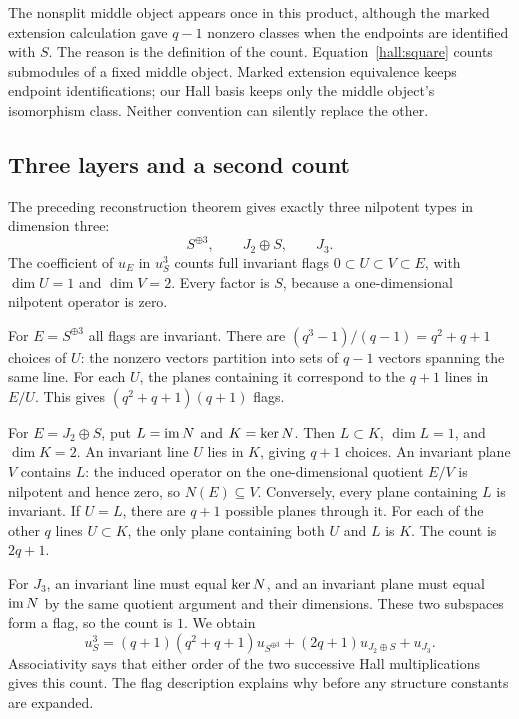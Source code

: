 The nonsplit middle object appears once in this product, although the
marked extension calculation gave $q-1$ nonzero classes when the
endpoints are identified with $S$. The reason is the definition of the
count. Equation~\eqref{hall:square} counts submodules of a fixed middle
object. Marked extension equivalence keeps endpoint identifications;
our Hall basis keeps only the middle object's isomorphism class.
Neither convention can silently replace the other.

\subsection{Three layers and a second count}

The preceding reconstruction theorem gives exactly three nilpotent
types in dimension three:
\[
S^{\oplus3},\qquad J_2\oplus S,\qquad J_3.
\]
The coefficient of $u_E$ in $u_S^3$ counts full invariant flags
$0\subset U\subset V\subset E$, with $\dim U=1$ and $\dim V=2$.
Every factor is $S$, because a one-dimensional nilpotent operator is zero.

For $E=S^{\oplus3}$ all flags are invariant. There are
$(q^3-1)/(q-1)=q^2+q+1$ choices of $U$: the nonzero vectors partition
into sets of $q-1$ vectors spanning the same line. For each $U$, the
planes containing it correspond to the $q+1$ lines in $E/U$.
This gives $(q^2+q+1)(q+1)$ flags.

For $E=J_2\oplus S$, put $L=\operatorname{im} N$ and $K=\operatorname{ker} N$. Then
$L\subset K$, $\dim L=1$, and $\dim K=2$. An invariant line $U$ lies
in $K$, giving $q+1$ choices. An invariant plane $V$ contains $L$:
the induced operator on the one-dimensional quotient $E/V$ is
nilpotent and hence zero, so $N(E)\subseteq V$. Conversely, every plane
containing $L$ is invariant. If $U=L$, there are $q+1$ possible planes
through it. For each of the other $q$ lines $U\subset K$, the only
plane containing both $U$ and $L$ is $K$. The count is $2q+1$.

For $J_3$, an invariant line must equal $\operatorname{ker} N$, and an invariant
plane must equal $\operatorname{im} N$ by the same quotient argument and their
dimensions. These two subspaces form a flag, so the count is $1$.
We obtain
\begin{equation}\label{hall:cube}
u_S^3=(q+1)(q^2+q+1)u_{S^{\oplus3}}
       +(2q+1)u_{J_2\oplus S}+u_{J_3}.
\end{equation}
Associativity says that either order of the two successive Hall
multiplications gives this count. The flag description explains why
before any structure constants are expanded.

